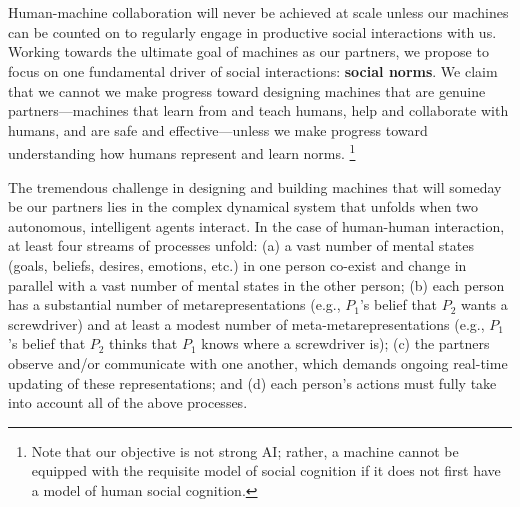 
\section{}


Human-machine collaboration will never be achieved at scale unless our
machines can be counted on to regularly engage in productive social
interactions with us.  Working towards the ultimate goal of machines
as our partners, we propose to focus on one fundamental driver of
social interactions: \textbf{social norms}.  We claim that we cannot
we make progress toward designing machines that are genuine
partners---machines that learn from and teach humans, help and
collaborate with humans, and are safe and effective---unless we make
progress toward understanding how humans represent and learn norms.%
\footnote{Note that our objective is not strong AI; rather, a machine
  cannot be equipped with the requisite model of social cognition if
  it does not first have a model of human social cognition.}


The tremendous challenge in designing and building machines that will
someday be our partners lies in the complex dynamical system that
unfolds when two autonomous, intelligent agents interact.  In the case
of human-human interaction, at least four streams of processes unfold:
(a) a vast number of mental states (goals, beliefs, desires, emotions,
etc.) in one person co-exist and change in parallel with a vast number
of mental states in the other person; (b) each person has a
substantial number of metarepresentations (e.g., $P_1$'s belief that
$P_2$ wants a screwdriver) and at least a modest number of
meta-metarepresentations (e.g., $P_1$'s belief that $P_2$ thinks that
$P_1$ knows where a screwdriver is); (c) the partners observe and/or
communicate with one another, which demands ongoing real-time updating
of these representations; and (d) each person's actions must fully
take into account all of the above processes.

